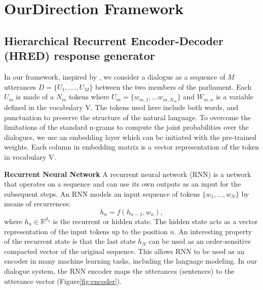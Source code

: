 \section{OurDirection Framework}

\subsection{Hierarchical Recurrent Encoder-Decoder (HRED) response generator}
In our framework, inspired by \cite{DBLP:journals/corr/SerbanSBCP15}, we consider a dialogue as a sequence of $M$ utterances $D = \{U_1, ...., U_M\}$ between the two members of the parliament. Each $U_m$ is made of a $N_m$ tokens where $U_m = \{w_{m,1}, ... w_{m,N_m} \}$ and $W_{m,n}$ is a variable defined in the vocabulary V. The tokens used here include both words, and punctuation to preserve the structure of the natural language.  To overcome the limitations of the standard n-grams to compute the joint probabilities over the dialogues, we use an embedding layer which can be initiated with the pre-trained weights. Each column in embedding matrix is a vector representation of the token in vocabulary V. 

\textbf{Recurrent Neural Network} A recurrent neural network (RNN) is a network that operates on a sequence and can use its own outputs as an input for the subsequent steps.  An RNN models an input sequence of tokens $\{w_1, ..., w_N\}$ by means of recurrences: 
\begin{equation}
h_n = f(h_{n-1}, w_n),
\end{equation}
where \(h_n \in  \mathbb{R}^{d_n} \) is the recurrent or hidden state. The hidden state acts as a vector representation of the input tokens up to the position $n$.  An interesting property of the recurrent state is that the last state $h_N$ can be used as an order-sensitive compacted vector of the original sequence. This allows RNN to be used as an encoder in many machine learning tasks, including the language modeling. In our dialogue system, the RNN encoder maps the utterances (sentences)  to the utterance vector (Figure\ref{fig:encoder}).

